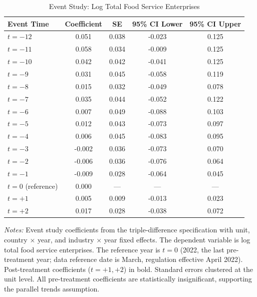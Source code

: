 \begin{table}[!t]
\centering
\caption{Event Study: Log Total Food Service Enterprises}
\label{tab:event_study}
\begin{tabular}{lcccc}
\hline\hline
Event Time & Coefficient & SE & 95\% CI Lower & 95\% CI Upper \\
\hline
{$t = -12$} & 0.051 & 0.038 & -0.023 & 0.125 \\
{$t = -11$} & 0.058 & 0.034 & -0.009 & 0.125 \\
{$t = -10$} & 0.042 & 0.042 & -0.041 & 0.125 \\
{$t = -9$} & 0.031 & 0.045 & -0.058 & 0.119 \\
{$t = -8$} & 0.015 & 0.032 & -0.049 & 0.078 \\
{$t = -7$} & 0.035 & 0.044 & -0.052 & 0.122 \\
{$t = -6$} & 0.007 & 0.049 & -0.088 & 0.103 \\
{$t = -5$} & 0.012 & 0.043 & -0.073 & 0.097 \\
{$t = -4$} & 0.006 & 0.045 & -0.083 & 0.095 \\
{$t = -3$} & -0.002 & 0.036 & -0.073 & 0.070 \\
{$t = -2$} & -0.006 & 0.036 & -0.076 & 0.064 \\
{$t = -1$} & -0.009 & 0.028 & -0.064 & 0.045 \\
$t = 0$ (reference) & 0.000 & --- & --- & --- \\
\textbf{$t = +1$} & 0.005 & 0.009 & -0.013 & 0.023 \\
\textbf{$t = +2$} & 0.017 & 0.028 & -0.038 & 0.072 \\
\hline\hline
\end{tabular}
\begin{tablenotes}[flushleft]
\small
\item \textit{Notes:} Event study coefficients from the triple-difference specification 
with unit, country $\times$ year, and industry $\times$ year fixed effects. 
The dependent variable is log total food service enterprises. The reference year is 
$t = 0$ (2022, the last pre-treatment year; data reference date is March, regulation 
effective April 2022). Post-treatment coefficients ($t = +1, +2$) in bold. 
Standard errors clustered at the unit level. All pre-treatment coefficients are 
statistically insignificant, supporting the parallel trends assumption.
\end{tablenotes}
\end{table}
